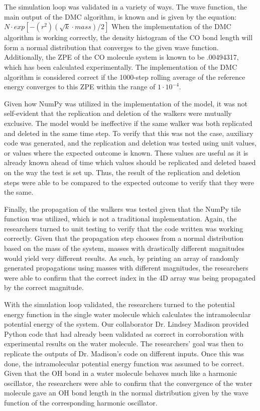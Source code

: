 \documentclass[journal=jacsat,manuscript=article]{achemso}
\begin{document}
The simulation loop was validated in a variety of ways. The wave function, the main output of the DMC algorithm, is known and is given by the equation: $N\cdot exp[-(r^2)(\sqrt k\cdot mass)/2]$ When the implementation of the DMC algorithm is working correctly, the density histogram of the CO bond length will form a normal distribution that converges to the given wave function. Additionally, the ZPE of the CO molecule system is known to be .00494317, which has been calculated experimentally. The implementation of the DMC algorithm is considered correct if the 1000-step rolling average of the reference energy converges to this ZPE within the range of $1\cdot10^{-4}$. 
	
Given how NumPy was utilized in the implementation of the model, it was not self-evident that the replication and deletion of the walkers were mutually exclusive. The model would be ineffective if the same walker was both replicated and deleted in the same time step. To verify that this was not the case, auxiliary code was generated, and the replication and deletion was tested using unit values, or values where the expected outcome is known. These values are useful as it is already known ahead of time which values should be replicated and deleted based on the way the test is set up. Thus, the result of the replication and deletion steps were able to be compared to the expected outcome to verify that they were the same.

Finally, the propagation of the walkers was tested given that the NumPy tile function was utilized, which is not a traditional implementation. Again, the researchers turned to unit testing to verify that the code written was working correctly. Given that the propagation step chooses from a normal distribution based on the mass of the system, masses with drastically different magnitudes would yield very different results. As such, by printing an array of randomly generated propagations using masses with different magnitudes, the researchers were able to confirm that the correct index in the 4D array was being propagated by the correct magnitude. 

With the simulation loop validated, the researchers turned to the potential energy function in the single water molecule which calculates the intramolecular potential energy of the system. Our collaborator Dr. Lindsey Madison provided Python code that had already been validated as correct in corroboration with experimental results on the water molecule. The researchers’ goal was then to replicate the outputs of Dr. Madison’s code on different inputs. Once this was done, the intramolecular potential energy function was assumed to be correct. Given that the OH bond in a water molecule behaves much like a harmonic oscillator, the researchers were able to confirm that the convergence of the water molecule gave an OH bond length in the normal distribution given by the wave function of the corresponding harmonic oscillator. 
\end{document}
